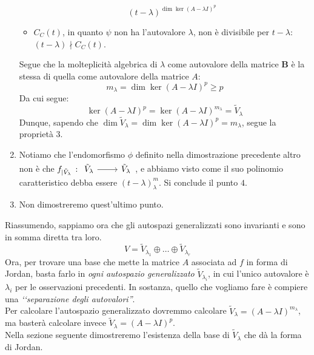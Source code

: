 \begin{demonstration}
\begin{enumerate}[label=\Roman*]
\begin{itemize}
	\begin{equation*}
		\left(t-\lambda\right)^{\dim\ker\left(A-\lambda I\right)^p}
	\end{equation*}
	\item $C_C\left(t\right)$, in quanto $\psi$ non ha l'autovalore $\lambda$, non è divisibile per $t-\lambda$: $	\left(t-\lambda\right) \nmid C_C\left(t\right)$.
\end{itemize}
Segue che la molteplicità algebrica di $\lambda$ come autovalore della matrice $\mathbf{B}$ è la stessa di quella come autovalore della matrice $A$:
\begin{equation*}
	m_{\lambda}=\dim\ker\left(A-\lambda I\right)^p\geq p
\end{equation*}
Da cui segue:
\begin{equation*}
	\ker\left(A-\lambda I\right)^p=\ker\left(A-\lambda I\right)^{m_\lambda}=\tilde{V}_{\lambda}
\end{equation*}
Dunque, sapendo che $\dim \tilde{V}_{\lambda} = \dim \ker\left(A-\lambda I\right)^p=m_{\lambda}$, segue la proprietà $3$.
\item Notiamo che l'endomorfismo $\phi$ definito nella dimostrazione precedente altro non è che $f_{\mid\tilde V_{\lambda}}\ \colon\funz{\ }{\tilde{V}_{\lambda}}{\tilde{V}_{\lambda}}$, e abbiamo visto come il suo polinomio caratteristico debba essere $\left(t-\lambda\right)^m_{\lambda}$. Si conclude il punto $4$.
\item Non dimostreremo quest'ultimo punto.
\end{enumerate}
\end{demonstration}
Riassumendo, sappiamo ora che gli autospazi generalizzati sono invarianti e sono in somma diretta tra loro.
\begin{equation}
	V=\tilde{V}_{\lambda_1}\oplus\ldots\oplus\tilde{V}_{\lambda_r}
\end{equation}
Ora, per trovare una base che mette la matrice $A$ associata ad $f$ in forma di Jordan, basta farlo in \textit{ogni autospazio generalizzato} $\tilde{V}_{\lambda_i}$, in cui l'unico autovalore è $\lambda_i$ per le osservazioni precedenti. In sostanza, quello che vogliamo fare è compiere una \textit{‘‘separazione degli autovalori''}.\\
Per calcolare l'autospazio generalizzato dovremmo calcolare $\tilde{V}_{\lambda}=\left(A-\lambda I\right)^{m_{\lambda}}$, ma basterà calcolare invece $\tilde{V}_{\lambda}=\left(A-\lambda I\right)^{p}$. \\
Nella sezione seguente dimostreremo l'esistenza della base di $\tilde{V}_{\lambda}$ che dà la forma di Jordan.
